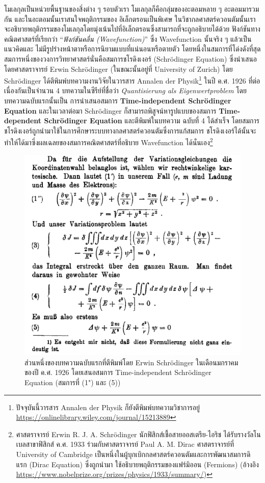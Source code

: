 โมเลกุลเป็นหน่วยพื้นฐานของสิ่งต่าง ๆ รอบตัวเรา โมเลกุลก็คือกลุ่มของอะตอมหลาย ๆ อะตอมมารวมกัน และในอะตอมนั้นเราสนใจพฤติกรรมของ%
อิเล็กตรอนเป็นพิเศษ ในวิชากลศาสตร์ควอนตัมนั้นเราจะอธิบายพฤติกรรมของโมเลกุลโดยมุ่งเน้นไปที่อิเล็กตรอนซึ่งสามารถที่จะถูกอธิบายได้ด้วย%
ฟังก์ชันทางคณิตศาสตร์ที่เรียกว่า \enquote{\textit{ฟังก์ชันคลื่น (Wavefunction)}} ซึ่ง Wavefunction นั้นจริง ๆ แล้วเป็นแนวคิดและ%
ไม่มีรูปร่างหน้าตาหรือการนิยามแบบที่แน่นอนหรือตายตัว โดยหนึ่งในสมการที่โด่งดังที่สุดสมการหนึ่งของวงการวิทยาศาสตร์นั่นคือสมการชโรดิงเงอร์ 
(Schr\"{o}dinger Equation)\autocite{schleich2013} ซึ่งนำเสนอโดยศาสตราจารย์ Erwin Schr\"{o}dinger (ในขณะนั้นอยู่ที่ 
University of Zurich) โดย Schr\"{o}dinger ได้ตีพิมพ์บทความงานวิจัยในวารสาร Annalen der Physik\footnote{ปัจจุบันนี้วารสาร
Annalen der Physik ก็ยังตีพิมพ์บทความวิชาการอยู่ \url{https://onlinelibrary.wiley.com/journal/15213889}} ในปี ค.ศ. 
1926 ที่ต่อเนื่องกันเป็นจำนวน 4 บทความในซีรีย์ที่ชื่อว่า \textit{Quantisierung als Eigenwertproblem} โดยบทความฉบับแรกนั้นเป็น%
การนำเสนอสมการ \textbf{Time-independent Schr\"{o}dinger Equation}\autocite{schrodinger1926} และในเวลาต่อมา 
Schr\"{o}dinger ก็สามารถพิสูจน์หารูปแบบของสมการ \textbf{Time-dependent Schr\"{o}dinger Equation} และตีพิมพ์ในบทความ%
ฉบับที่ 4 ได้สำเร็จ\autocite{schrodinger1926a} โดยสมการชโรดิงเงอร์ถูกนำมาใช้ในการศึกษาระบบทางกลศาสตร์ควอนตัมซึ่งการแก้สมการ%
ชโรดิงเงอร์ได้นั้นจะทำให้ได้มาซึ่งผลเฉลยของสมการคณิตศาสตร์ที่อธิบาย Wavefunction ได้นั่นเอง\footnote{ศาสตราจารย์ Erwin R. J. A.
Schr\"{o}dinger นักฟิสิกส์เชื้อสายออสเตรีย-ไอริช ได้รับรางวัลโนเบลสาขาฟิสิกส์ ค.ศ. 1933 ร่วมกับศาสตราจารย์ Paul A. M. Dirac 
ศาสตราจารย์ที่ University of Cambridge เป็นหนึ่งในผู้บุกเบิกกลศาสตร์ควอนตัมและการพัฒนาสมการดิแรก (Dirac Equation) ซึ่งถูกนำมา%
ใช้อธิบายพฤติกรรมของแฟร์มิออน (Fermions) (อ้างอิง \url{https://www.nobelprize.org/prizes/physics/1933/summary/})} 

\begin{figure}[htbp]
    \centering
    \includegraphics[width=0.8\linewidth]{fig/time-inde-schrodinger-eq.png}
    \caption{ส่วนหนึ่งของบทความฉบับแรกที่ตีพิมพ์โดย Erwin Schr\"{o}dinger ในเดือนมกราคมของปี ค.ศ. 1926 โดยเสนอสมการ 
    Time-independent Schr\"{o}dinger Equation (สมการที่ (1") และ (5))}
    \label{fig:schrodinger_paper_1}
\end{figure}

